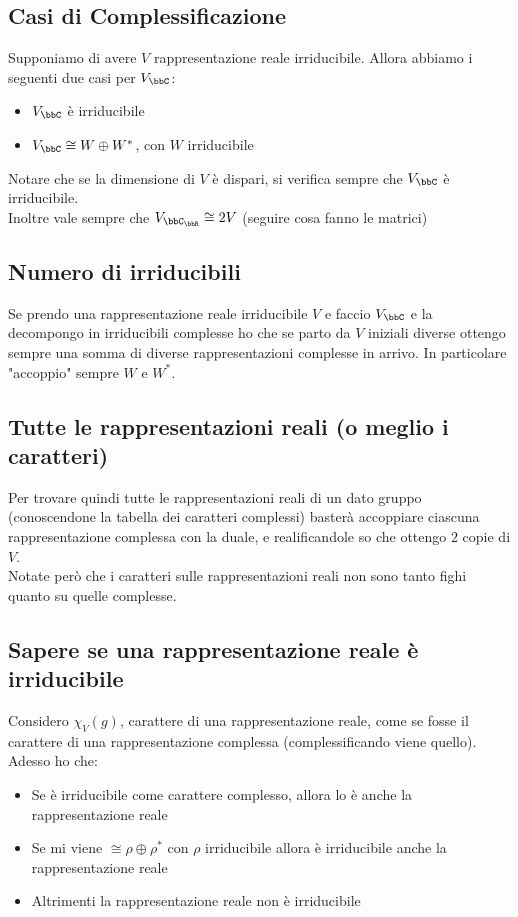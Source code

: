 \documentclass[a4paper,NoNotes,GeneralMath]{stdmdoc}
\begin{document}
	\subsection*{Casi di Complessificazione}
	Supponiamo di avere $V$ rappresentazione reale irriducibile. Allora abbiamo i seguenti due casi per $V_\bbC$:
	\begin{itemize}
		\item $V_\bbC$ è irriducibile
		\item $V_\bbC \cong W \oplus W^{*}$, con $W$ irriducibile
	\end{itemize} 
	Notare che se la dimensione di $V$ è dispari, si verifica sempre che $V_\bbC$ è irriducibile. \\
	Inoltre vale sempre che $V_{\bbC_\bbR} \cong 2 V$ (seguire cosa fanno le matrici)
	
	\subsection*{Numero di irriducibili}
	Se prendo una rappresentazione reale irriducibile $V$ e faccio $V_\bbC$ e la decompongo in irriducibili complesse ho che se parto da $V$ iniziali diverse ottengo sempre una somma di diverse rappresentazioni complesse in arrivo. In particolare "accoppio" sempre $W$ e $W^{*}$.
	
	\subsection*{Tutte le rappresentazioni reali (o meglio i caratteri)}
	Per trovare quindi tutte le rappresentazioni reali di un dato gruppo (conoscendone la tabella dei caratteri complessi) basterà accoppiare ciascuna rappresentazione complessa con la duale, e realificandole so che ottengo $2$ copie di $V$. \\
	Notate però che i caratteri sulle rappresentazioni reali non sono tanto fighi quanto su quelle complesse.
	
	\subsection*{Sapere se una rappresentazione reale è irriducibile}
	Considero $\chi_V(g)$, carattere di una rappresentazione reale, come se fosse il carattere di una rappresentazione complessa (complessificando viene quello). Adesso ho che:
	\begin{itemize}
		\item Se è irriducibile come carattere complesso, allora lo è anche la rappresentazione reale
		\item Se mi viene $\cong \rho \oplus \rho^{*}$ con $\rho$ irriducibile allora è irriducibile anche la rappresentazione reale
		\item Altrimenti la rappresentazione reale non è irriducibile
	\end{itemize}
\end{document}
